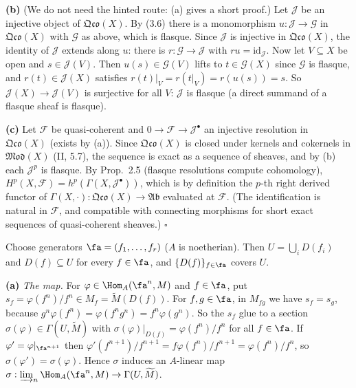\documentclass[11pt]{article}
\begin{document}
\textbf{(b)} (We do not need the hinted route: (a) gives a short proof.) Let $\mathcal J$ be an injective object of $\mathfrak{Qco}(X)$. By (3.6) there is a monomorphism $u:\mathcal J\to\mathcal G$ in $\mathfrak{Qco}(X)$ with $\mathcal G$ as above, which is flasque. Since $\mathcal J$ is injective in $\mathfrak{Qco}(X)$, the identity of $\mathcal J$ extends along $u$: there is $r:\mathcal G\to\mathcal J$ with $ru=\mathrm{id}_{\mathcal J}$. Now let $V\subseteq X$ be open and $s\in\mathcal J(V)$. Then $u(s)\in\mathcal G(V)$ lifts to $t\in\mathcal G(X)$ since $\mathcal G$ is flasque, and $r(t)\in\mathcal J(X)$ satisfies $r(t)|_V=r(t|_V)=r(u(s))=s$. So $\mathcal J(X)\to\mathcal J(V)$ is surjective for all $V$: $\mathcal J$ is flasque (a direct summand of a flasque sheaf is flasque).

\textbf{(c)} Let $\mathcal F$ be quasi-coherent and $0\to\mathcal F\to\mathcal J^\bullet$ an injective resolution in $\mathfrak{Qco}(X)$ (exists by (a)). Since $\mathfrak{Qco}(X)$ is closed under kernels and cokernels in $\mathfrak{Mod}(X)$ (II, 5.7), the sequence is exact as a sequence of sheaves, and by (b) each $\mathcal J^p$ is flasque. By Prop.~2.5 (flasque resolutions compute cohomology), $H^p(X,\mathcal F)=h^p(\Gamma(X,\mathcal J^\bullet))$, which is by definition the $p$-th right derived functor of $\Gamma(X,\cdot):\mathfrak{Qco}(X)\to\mathfrak{Ab}$ evaluated at $\mathcal F$. (The identification is natural in $\mathcal F$, and compatible with connecting morphisms for short exact sequences of quasi-coherent sheaves.) \hfill$\square$

\pf
Choose generators $\fa=(f_1,\dots,f_r)$ ($A$ is noetherian). Then $U=\bigcup_iD(f_i)$ and $D(f)\subseteq U$ for every $f\in\fa$, and $\{D(f)\}_{f\in\fa}$ covers $U$.

\textbf{(a)} \emph{The map.} For $\varphi\in\Hom_A(\fa^n,M)$ and $f\in\fa$, put $s_f=\varphi(f^n)/f^n\in M_f=\widetilde M(D(f))$. For $f,g\in\fa$, in $M_{fg}$ we have $s_f=s_g$, because $g^n\varphi(f^n)=\varphi(f^ng^n)=f^n\varphi(g^n)$. So the $s_f$ glue to a section $\sigma(\varphi)\in\Gamma(U,\widetilde M)$ with $\sigma(\varphi)|_{D(f)}=\varphi(f^n)/f^n$ for all $f\in\fa$. If $\varphi'=\varphi|_{\fa^{n+1}}$ then $\varphi'(f^{n+1})/f^{n+1}=f\varphi(f^n)/f^{n+1}=\varphi(f^n)/f^n$, so $\sigma(\varphi')=\sigma(\varphi)$. Hence $\sigma$ induces an $A$-linear map $\sigma:\varinjlim_n\Hom_A(\fa^n,M)\to\Gamma(U,\widetilde M)$.
\end{document}
